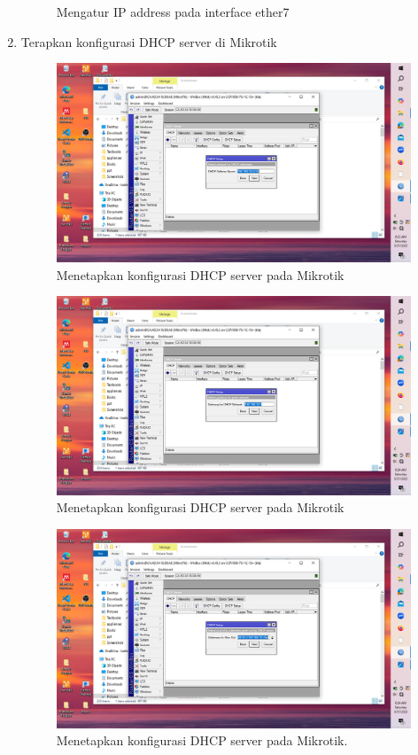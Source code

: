 \begin{enumerate}
\begin{figure}[H]
        \caption{Mengatur IP address pada interface ether7}
        \label{fig:menambahkan-ip-ether7}
    \end{figure}
    \item Terapkan konfigurasi DHCP server di Mikrotik
     \begin{figure}[H]
        \centering
        \includegraphics[width=0.5\linewidth]{P1/img/gambar4a.jpeg}
        \caption{Menetapkan konfigurasi DHCP server pada Mikrotik}
        \label{fig:mengkonfigurasikan-dhcp-server-mikrotik}
    \end{figure}

    \begin{figure}[H]
        \centering
        \includegraphics[width=0.5\linewidth]{P1/img/gambar4b.jpeg}
        \caption{Menetapkan konfigurasi DHCP server pada Mikrotik}
        \label{fig:mengkonfigurasikan-dhcp-server-mikrotik}
    \end{figure}

    \begin{figure}[H]
        \centering
        \includegraphics[width=0.5\linewidth]{P1/img/gambar4c.jpeg}
        \caption{Menetapkan konfigurasi DHCP server pada Mikrotik.}
        \label{fig:mengkonfigurasikan-dhcp-server-mikrotik}
    \end{figure}
    

\end{enumerate}
